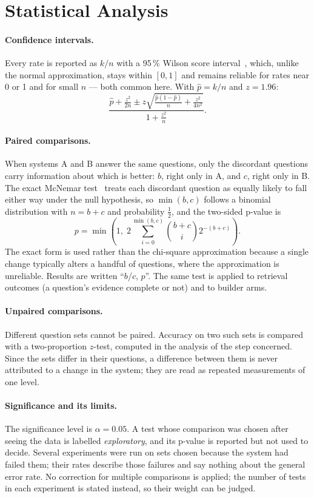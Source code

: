 \section{Statistical Analysis}\label{sec:ch03-statistical-analysis}

\paragraph{Confidence intervals.} Every rate is reported as $k/n$ with a 95\,\% Wilson score
interval~\cite{wilson1927probable}, which, unlike the normal approximation, stays within $[0,1]$ and remains
reliable for rates near 0 or 1 and for small $n$ --- both common here. With $\hat p = k/n$ and $z = 1.96$:
\[
\frac{\hat p + \frac{z^2}{2n} \pm z\sqrt{\frac{\hat p(1-\hat p)}{n} + \frac{z^2}{4n^2}}}{1 + \frac{z^2}{n}}.
\]

\paragraph{Paired comparisons.} When systems A and B answer the same questions, only the discordant questions
carry information about which is better: $b$, right only in A, and $c$, right only in B. The exact McNemar
test~\cite{mcnemar1947note,dietterich1998approximate} treats each discordant question as equally likely to
fall either way under the null hypothesis, so $\min(b,c)$ follows a binomial distribution with
$n = b + c$ and probability $\frac12$, and the two-sided p-value is
\[
p = \min\left(1,\; 2\sum_{i=0}^{\min(b,c)} \binom{b+c}{i} 2^{-(b+c)}\right).
\]
The exact form is used rather than the chi-square approximation because a single change typically alters a
handful of questions, where the approximation is unreliable. Results are written ``$b$/$c$, $p$''. The same
test is applied to retrieval outcomes (a question's evidence complete or not) and to builder arms.

\paragraph{Unpaired comparisons.} Different question sets cannot be paired. Accuracy on two such sets is
compared with a two-proportion $z$-test, computed in the analysis of the step concerned. Since the sets differ
in their questions, a difference between them is never attributed to a change in the system; they are read as
repeated measurements of one level.

\paragraph{Significance and its limits.} The significance level is $\alpha = 0.05$. A test whose comparison
was chosen after seeing the data is labelled \emph{exploratory}, and its p-value is reported but not used to
decide. Several experiments were run on sets chosen because the system had failed them; their rates describe
those failures and say nothing about the general error rate. No correction for multiple comparisons is
applied; the number of tests in each experiment is stated instead, so their weight can be judged.

